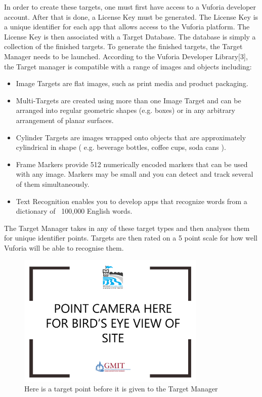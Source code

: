 In order to create these targets, one must first have access to a Vuforia developer account. After that is done, a License Key must be generated. The License Key is a unique identifier for each app that allows access to the Vuforia platform. The License Key is then associated with a Target Database. The database is simply a collection of the finished targets. To generate the finished targets, the Target Manager needs to be launched. According to the Vuforia Developer Library[3], the Target manager is compatible with a range of images and objects including: 
\begin{itemize}
	\item Image Targets are flat images, such as print media and product packaging.
	
	\item Multi-Targets are created using more than one Image Target and can be arranged into regular geometric shapes (e.g. boxes) or in any arbitrary arrangement of planar surfaces.
	
	\item Cylinder Targets are images wrapped onto objects that are approximately cylindrical in shape ( e.g. beverage bottles, coffee cups, soda cans ).
	
	\item Frame Markers provide 512 numerically encoded markers that can be used with any image. Markers may be small and you can detect and track several of them simultaneously.
	
	\item Text Recognition enables you to develop apps that recognize words from a dictionary of ~100,000 English words.
\end{itemize}

The Target Manager takes in any of these target types and then analyses them for unique identifier points. Targets are then rated on a 5 point scale for how well Vuforia will be able to recognise them.


\begin{figure}[ht!]
	\centering
	\includegraphics[width=90mm]{raw}
	\caption{Here is a target point before it is given to the Target Manager \label{overflow}}
\end{figure}

